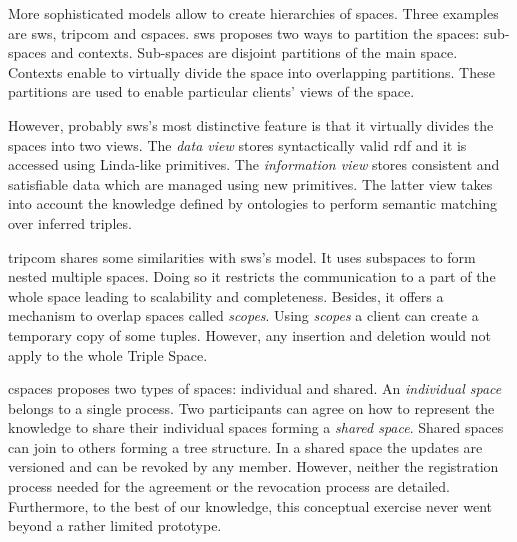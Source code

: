 More sophisticated models allow to create hierarchies of spaces.
Three examples are \ac{sws}, \ac{tripcom} \citep{simperl_coordination_2007} and \ac{cspaces}.
\ac{sws} \citep{tolksdorf_coordination_2006} proposes two ways to partition the spaces: sub-spaces and contexts.
Sub-spaces are disjoint partitions of the main space.
Contexts enable to virtually divide the space into overlapping partitions.
These partitions are used to enable particular clients' views of the space.


However, probably \ac{sws}'s most distinctive feature is that it virtually divides the spaces into two views.
The \emph{data view} stores syntactically valid \ac{rdf} and it is accessed using Linda-like primitives.
The \emph{information view} stores consistent and satisfiable data which are managed using new primitives.
The latter view takes into account the knowledge defined by ontologies to perform semantic matching over inferred triples.


\ac{tripcom} shares some similarities with \ac{sws}'s model.
It uses subspaces to form nested multiple spaces.
Doing so it restricts the communication to a part of the whole space leading to scalability and completeness. %
Besides, it offers a mechanism to overlap spaces called \emph{scopes}.
Using \emph{scopes} a client can create a temporary copy of some tuples.
However, any insertion and deletion would not apply to the whole Triple Space.

\ac{cspaces} \citep{martinrecuerda_towards_2005} proposes two types of spaces: individual and shared.
An \emph{individual space} belongs to a single process.
Two participants can agree on how to represent the knowledge to share their individual spaces forming a \emph{shared space}.
Shared spaces can join to others forming a tree structure.
In a shared space the updates are versioned and can be revoked by any member.
However, neither the registration process needed for the agreement or the revocation process are detailed.
Furthermore, to the best of our knowledge, this conceptual exercise never went beyond a rather limited prototype.


